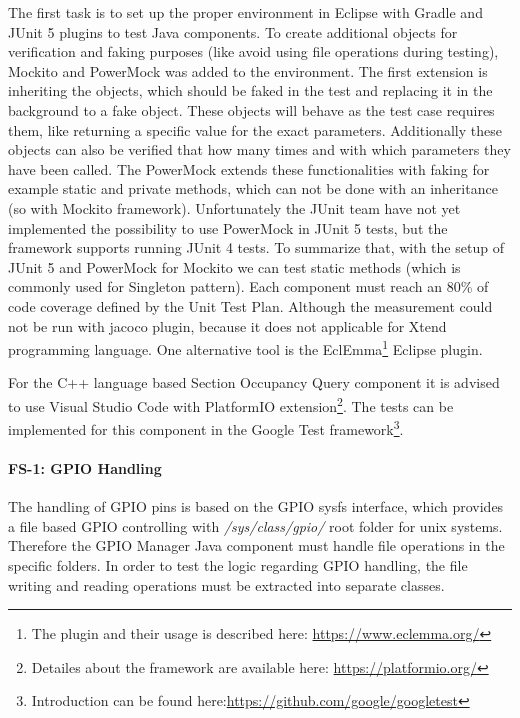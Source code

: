 The first task is to set up the proper environment in Eclipse with Gradle and JUnit 5 \cite{JUnit5} plugins to test Java components. To create additional objects for verification and faking purposes (like avoid using file operations during testing), Mockito \cite{Mockito} and PowerMock \cite{PowerMock} was added to the environment. The first extension is inheriting the objects, which should be faked in the test and replacing it in the background to a fake object. These objects will behave as the test case requires them, like returning a specific value for the exact parameters. Additionally these objects can also be verified that how many times and with which parameters they have been called. The PowerMock extends these functionalities with faking for example static and private methods, which can not be done with an inheritance (so with Mockito framework). Unfortunately the JUnit team have not yet implemented the possibility to use PowerMock in JUnit 5 tests, but the framework supports running JUnit 4 tests. To summarize that, with the setup of JUnit 5 and PowerMock for Mockito we can test static methods (which is commonly used for Singleton pattern). Each component must reach an 80\% of code coverage defined by the Unit Test Plan. Although the measurement could not be run with jacoco plugin, because it does not applicable for Xtend programming language. One alternative tool is the EclEmma\footnote{The plugin and their usage is described here: \url{https://www.eclemma.org/}} Eclipse plugin.

For the C++ language based Section Occupancy Query component it is advised to use Visual Studio Code with PlatformIO extension\footnote{Detailes about the framework are available here: \url{https://platformio.org/}}. The tests can be implemented for this component in the Google Test framework\footnote{Introduction can be found here:\url{https://github.com/google/googletest}}.

\paragraph{FS-1: GPIO Handling} The handling of GPIO pins is based on the GPIO sysfs interface, which provides a file based GPIO controlling with \textit{/sys/class/gpio/} root folder for unix systems. Therefore the GPIO Manager Java component must handle file operations in the specific folders. In order to test the logic regarding GPIO handling, the file writing and reading operations must be extracted into separate classes.

